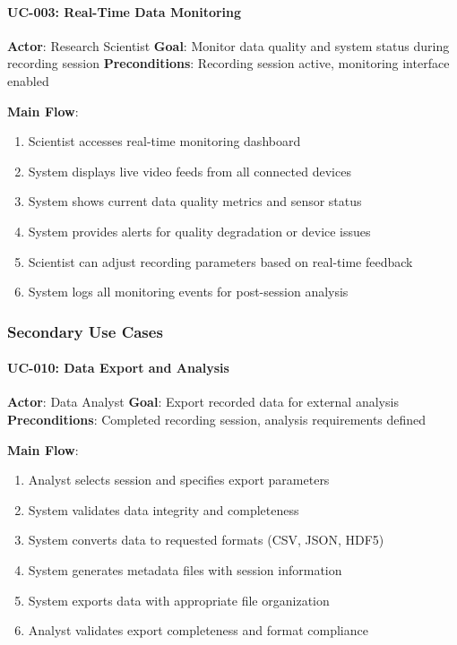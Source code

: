 \documentclass[11pt,a4paper]{report}
\begin{document}
\paragraph{UC-003: Real-Time Data Monitoring}

\textbf{Actor}: Research Scientist
\textbf{Goal}: Monitor data quality and system status during recording session
\textbf{Preconditions}: Recording session active, monitoring interface enabled

\textbf{Main Flow}:

\begin{enumerate}
\item Scientist accesses real-time monitoring dashboard
\item System displays live video feeds from all connected devices
\item System shows current data quality metrics and sensor status
\item System provides alerts for quality degradation or device issues
\item Scientist can adjust recording parameters based on real-time feedback
\item System logs all monitoring events for post-session analysis

\end{enumerate}
\subsubsection{Secondary Use Cases}

\paragraph{UC-010: Data Export and Analysis}

\textbf{Actor}: Data Analyst
\textbf{Goal}: Export recorded data for external analysis
\textbf{Preconditions}: Completed recording session, analysis requirements defined

\textbf{Main Flow}:

\begin{enumerate}
\item Analyst selects session and specifies export parameters
\item System validates data integrity and completeness
\item System converts data to requested formats (CSV, JSON, HDF5)
\item System generates metadata files with session information
\item System exports data with appropriate file organization
\item Analyst validates export completeness and format compliance

\end{enumerate}
\end{document}
